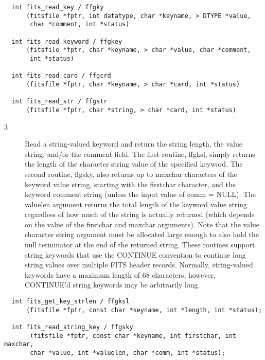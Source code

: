 \documentclass[11pt]{book}
\begin{document}
\begin{verbatim}
  int fits_read_key / ffgky
      (fitsfile *fptr, int datatype, char *keyname, > DTYPE *value,
       char *comment, int *status)

  int fits_read_keyword / ffgkey
      (fitsfile *fptr, char *keyname, > char *value, char *comment,
       int *status)

  int fits_read_card / ffgcrd
      (fitsfile *fptr, char *keyname, > char *card, int *status)

  int fits_read_str / ffgstr
      (fitsfile *fptr, char *string, > char *card, int *status)
\end{verbatim}

\begin{description}
\item[3 ] Read a string-valued keyword and return the string length, the value string,
    and/or the comment field.   The first routine, ffgksl, simply
    returns the length of the character string value of the specified keyword.
    The second routine, ffgsky, also returns up to maxchar characters
    of the keyword value string, starting with the firstchar character,
    and the keyword comment string (unless the input value of comm = NULL).
    The valuelen argument returns the total length of the keyword value string
    regardless of how much of the string is actually returned (which
    depends on the value of the firstchar and maxchar arguments).
    Note that the value character string argument must be allocated large enough to
    also hold the null terminator at the end of the returned string.  These
    routines support string keywords that use the CONTINUE convention to
    continue long string values over multiple FITS header records.  Normally,
    string-valued keywords have a maximum length of 68 characters, however,
   CONTINUE'd string keywords may be arbitrarily long. \label{ffgksl} \label{ffgsky}
\end{description}

\begin{verbatim}
  int fits_get_key_strlen / ffgksl
      (fitsfile *fptr, const char *keyname, int *length, int *status);

  int fits_read_string_key / ffgsky
       (fitsfile *fptr, const char *keyname, int firstchar, int maxchar,
       char *value, int *valuelen, char *comm, int *status);
\end{verbatim}
\end{document}
